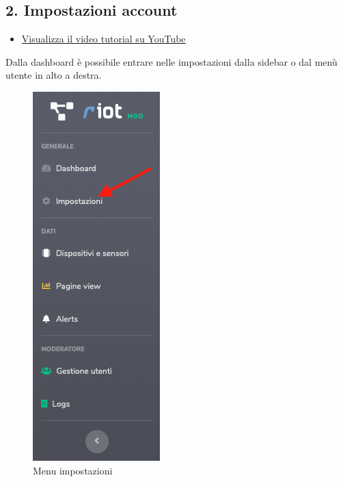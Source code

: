 \newpage \subsection{2. Impostazioni account}

	\begin{itemize}
		\item \href{https://www.youtube.com/watch?v=PjySMOLCtMA&list=PLPKYjnuIh1FA3b3jn_bwY_ztYzaFn2mIT&index=4}{Visualizza il video tutorial su YouTube} 
	\end{itemize}
	Dalla dashboard è possibile entrare nelle impostazioni dalla sidebar o dal menù utente in alto a destra.
	\begin{figure}[H]
		\centering
		\includegraphics[scale=0.600]{res/images/membro/menuImp.png}
		\caption{Menu impostazioni}
	\end{figure}
